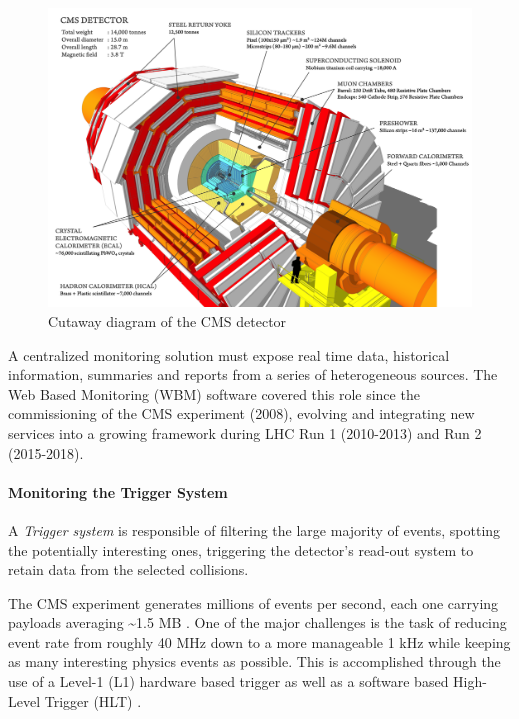 \documentclass[a4, oneside, 11pt, nobib]{memoir}
\begin{document}
\begin{figure}[H]
    \centerline{
        \includegraphics[width=0.8\paperwidth]{figures/cms}}
    \caption{Cutaway diagram of the CMS detector \cite{Sakuma_2014}}
    \label{fig:cms}
\end{figure}

		A centralized monitoring solution must expose real time data, historical information, summaries and reports from a series of heterogeneous sources. The Web Based Monitoring (WBM) software covered this role since the commissioning of the CMS experiment (2008), evolving and integrating new services into a growing framework during LHC Run 1 (2010-2013) and Run 2 (2015-2018).
\pagebreak
		\paragraph{Monitoring the Trigger System}

		A \textit{Trigger system} is responsible of filtering the large majority of events, spotting the potentially interesting ones, triggering the detector's read-out system to retain data from the selected collisions.

		The CMS experiment generates millions of events per second, each one carrying payloads averaging \~{}1.5 MB \cite{smdaqatlhc2016v3pdf-2020-10-12}. One of the major challenges is the task of reducing event rate from roughly 40 MHz down to a more manageable 1 kHz while keeping as many interesting physics events as possible. This is accomplished through the use of a Level-1 (L1) \cite{Bayatyan:706847} hardware based trigger as well as a software based High-Level Trigger (HLT) \cite{Khachatryan_2017}. 
\end{document}
